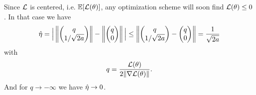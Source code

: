 \begin{remark}
	Since \(\mathcal{L}\) is centered, i.e. \(\mathbb{E}[\mathcal{L}(\theta)]\), any optimization
	scheme will soon find \(\mathcal{L}(\theta)\le 0\). In that case we have
	\begin{align*}
		\hat{\eta} =
		\Big| \left\|\begin{pmatrix}
			q \\ 1/\sqrt{2a}	
		\end{pmatrix}\right\|
		- \left\|\begin{pmatrix}
			q \\ 0
		\end{pmatrix}\right\|
		\Big|	
		\le \left\|\begin{pmatrix}
			q\\ 1/\sqrt{2a}
		\end{pmatrix} - \begin{pmatrix}
			q \\ 0
		\end{pmatrix}
		\right\| = \frac1{\sqrt{2a}}
	\end{align*}
	with
	\begin{align*}
		q = \frac{\mathcal{L}(\theta)}{2\|\nabla\mathcal{L}(\theta)\|}.
	\end{align*}
	And for \(q\to -\infty\) we have \(\hat{\eta}\to 0\).
\end{remark}
